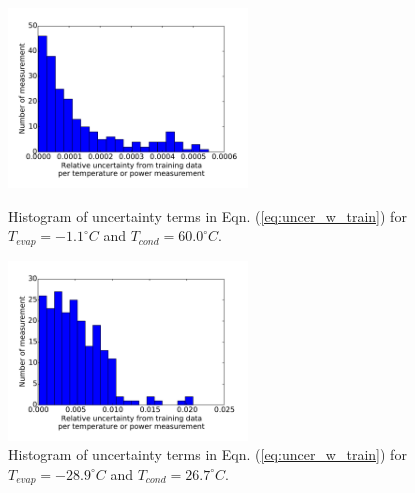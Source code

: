 \begin{figure}[h]
\begin{minipage}{15pc}
\includegraphics[width=15pc]{Map_1_low_uncer.pdf}
\caption{\label{fig:map_1_low_uncer}Histogram of uncertainty terms in Eqn. (\ref{eq:uncer_w_train}) for $T_{evap} = -1.1^\circ C$ and $T_{cond} = 60.0^\circ C$.}
\end{minipage}\hspace{2pc}%
\begin{minipage}{15pc}
\includegraphics[width=15pc]{Map_1_high_uncer.pdf}
\caption{\label{fig:map_1_high_uncer}Histogram of uncertainty terms in Eqn. (\ref{eq:uncer_w_train}) for $T_{evap} = -28.9^\circ C$ and $T_{cond} = 26.7^\circ C$.}
\end{minipage} 
\end{figure}

